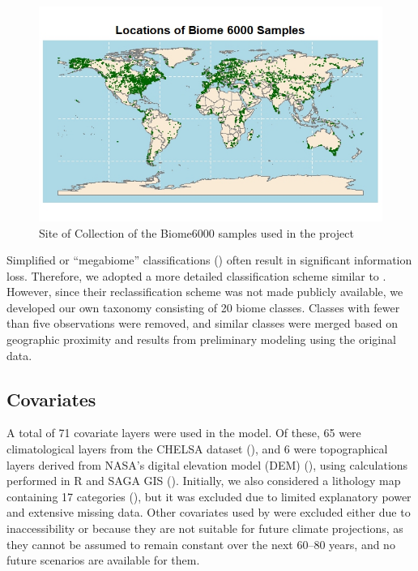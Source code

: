 \documentclass[
]{krantz}
\begin{document}
\begin{figure}

{\centering \includegraphics[width=0.8\linewidth]{work/05-naturalveg/figures/Biome6000} 

}

\caption{Site of Collection of the Biome6000 samples used in the project}\label{fig:biome}
\end{figure}

Simplified or ``megabiome'' classifications (\citet{harrison2012}) often result in significant information loss. Therefore, we adopted a more detailed classification scheme similar to \citet{hengl2018}. However, since their reclassification scheme was not made publicly available, we developed our own taxonomy consisting of 20 biome classes. Classes with fewer than five observations were removed, and similar classes were merged based on geographic proximity and results from preliminary modeling using the original data.

\subsection{Covariates}\label{covariates}

A total of 71 covariate layers were used in the model. Of these, 65 were climatological layers from the CHELSA dataset (\citet{karger2017}), and 6 were topographical layers derived from NASA's digital elevation model (DEM) (\citet{nasa2019}), using calculations performed in R and SAGA GIS (\citet{conrad2015}). Initially, we also considered a lithology map containing 17 categories (\citet{hartmann2012}), but it was excluded due to limited explanatory power and extensive missing data. Other covariates used by \citet{hengl2018} were excluded either due to inaccessibility or because they are not suitable for future climate projections, as they cannot be assumed to remain constant over the next 60--80 years, and no future scenarios are available for them.
\end{document}

